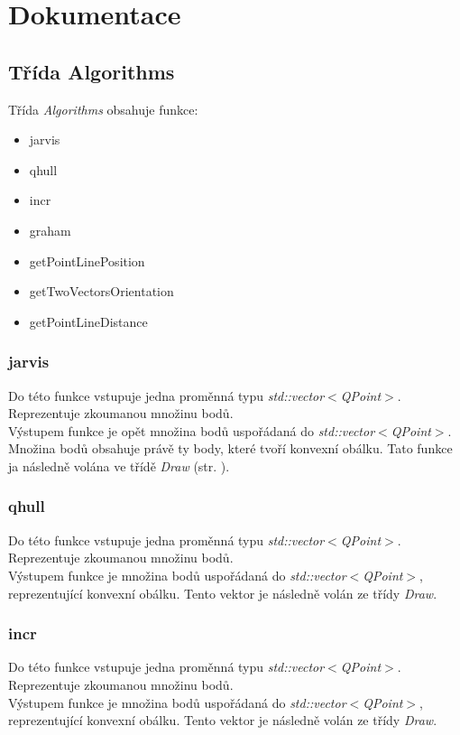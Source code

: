 \documentclass{article}
\begin{document}



\newpage
\section{Dokumentace \label{sec:alg}}
\subsection{Třída Algorithms}
Třída \emph{Algorithms} obsahuje funkce:
\begin{itemize}
\item jarvis
\item qhull
\item incr
\item graham
\item getPointLinePosition
\item getTwoVectorsOrientation
\item getPointLineDistance
\end{itemize}

\subsubsection{jarvis}
Do této funkce vstupuje jedna proměnná typu  \emph{std::vector$<$QPoint$>$}. Reprezentuje zkoumanou množinu bodů.\\
Výstupem funkce je opět množina bodů uspořádaná do \emph{std::vector$<$QPoint$>$}. Množina bodů obsahuje právě ty body, které tvoří konvexní obálku. Tato funkce ja následně volána ve třídě \emph{Draw} (str. \pageref{sec:draw}).

\subsubsection{qhull}
Do této funkce vstupuje jedna proměnná typu  \emph{std::vector$<$QPoint$>$}. Reprezentuje zkoumanou množinu bodů.\\
Výstupem funkce je množina bodů uspořádaná do \emph{std::vector$<$QPoint$>$}, reprezentující konvexní obálku. Tento vektor je následně volán ze třídy \emph{Draw}.

\subsubsection{incr}
Do této funkce vstupuje jedna proměnná typu  \emph{std::vector$<$QPoint$>$}. Reprezentuje zkoumanou množinu bodů.\\
Výstupem funkce je množina bodů uspořádaná do \emph{std::vector$<$QPoint$>$}, reprezentující konvexní obálku. Tento vektor je následně volán ze třídy \emph{Draw}.
\end{document}
